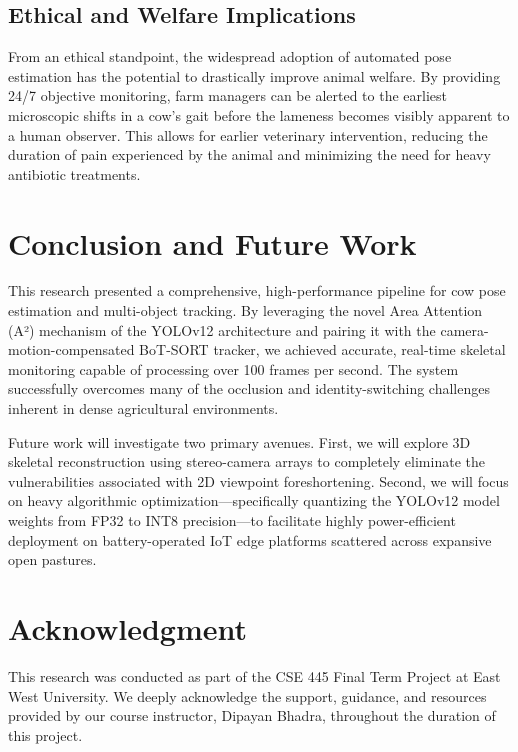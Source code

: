 \documentclass[conference]{IEEEtran}
\begin{document}
\subsection{Ethical and Welfare Implications}
From an ethical standpoint, the widespread adoption of automated pose estimation has the potential to drastically improve animal welfare. By providing 24/7 objective monitoring, farm managers can be alerted to the earliest microscopic shifts in a cow's gait before the lameness becomes visibly apparent to a human observer. This allows for earlier veterinary intervention, reducing the duration of pain experienced by the animal and minimizing the need for heavy antibiotic treatments.

\section{Conclusion and Future Work}
This research presented a comprehensive, high-performance pipeline for cow pose estimation and multi-object tracking. By leveraging the novel Area Attention (A²) mechanism of the YOLOv12 architecture and pairing it with the camera-motion-compensated BoT-SORT tracker, we achieved accurate, real-time skeletal monitoring capable of processing over 100 frames per second. The system successfully overcomes many of the occlusion and identity-switching challenges inherent in dense agricultural environments.

Future work will investigate two primary avenues. First, we will explore 3D skeletal reconstruction using stereo-camera arrays to completely eliminate the vulnerabilities associated with 2D viewpoint foreshortening. Second, we will focus on heavy algorithmic optimization—specifically quantizing the YOLOv12 model weights from FP32 to INT8 precision—to facilitate highly power-efficient deployment on battery-operated IoT edge platforms scattered across expansive open pastures.

\section*{Acknowledgment}
This research was conducted as part of the CSE 445 Final Term Project at East West University. We deeply acknowledge the support, guidance, and resources provided by our course instructor, Dipayan Bhadra, throughout the duration of this project.

\nocite{*}


\end{document}

